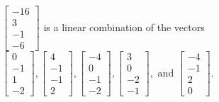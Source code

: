 \begin{exercise}
\begin{exerciseStatement}
  \end{exerciseStatement}
  \begin{exerciseAnswer}
   \(\left[\begin{array}{c}
-16 \\
3 \\
-1 \\
-6
\end{array}\right]\) 
  	 is  
	a linear combination of the vectors \(\left[\begin{array}{c}
0 \\
-1 \\
1 \\
-2
\end{array}\right] , \left[\begin{array}{c}
4 \\
-1 \\
-1 \\
2
\end{array}\right] , \left[\begin{array}{c}
-4 \\
0 \\
-1 \\
-2
\end{array}\right] , \left[\begin{array}{c}
3 \\
0 \\
-2 \\
-1
\end{array}\right] , \text{ and } \left[\begin{array}{c}
-4 \\
-1 \\
2 \\
0
\end{array}\right]\).

	
  


  \end{exerciseAnswer}
\end{exercise}